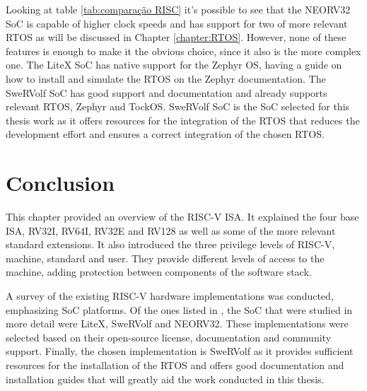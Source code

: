 Looking at table \ref{tab:comparação RISC} it's possible to see that the NEORV32 SoC is capable of higher clock speeds and has support for two of more relevant RTOS as will be discussed in Chapter \ref{chapter:RTOS}. However, none of these features is enough to make it the obvious choice, since it also is the more complex one. The LiteX SoC has native support for the Zephyr OS, having a guide on how to install and simulate the RTOS on the Zephyr documentation. The SweRVolf SoC has good support and documentation and already supports relevant RTOS, Zephyr and TockOS. SweRVolf SoC is the SoC selected for this thesis work as it offers resources for the integration of the RTOS that reduces the development effort and ensures a correct integration of the chosen RTOS.

\section{Conclusion}


This chapter provided an overview of the RISC-V ISA. It explained the four base ISA, RV32I, RV64I, RV32E and RV128 as well as some of the more relevant standard extensions. It also introduced the three privilege levels of RISC-V, machine, standard and user. They provide different levels of access to the machine, adding protection between components of the software stack.

A survey of the existing RISC-V hardware implementations was conducted, emphasizing SoC platforms. Of the ones listed in \cite{RISCV_list}, the SoC that were studied in more detail were LiteX, SweRVolf and NEORV32. These implementations were selected based on their open-source license, documentation and community support. Finally, the chosen implementation is SweRVolf as it provides sufficient resources for the installation of the RTOS and offers good documentation and installation guides that will greatly aid the work conducted in this thesis.